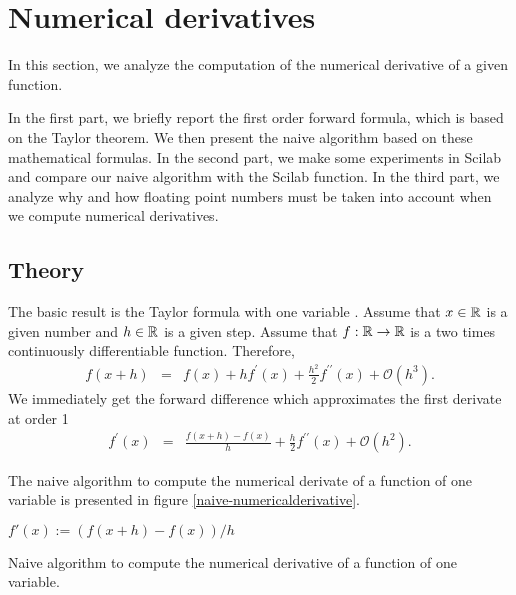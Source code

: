 %

\section{Numerical derivatives}

In this section, we analyze the computation of the numerical derivative of 
a given function.

In the first part, we briefly report the first order forward formula, which 
is based on the Taylor theorem.
We then present the naive algorithm based on these mathematical formulas. 
In the second part, we make some experiments in Scilab and compare our
naive algorithm with the  Scilab function.
In the third part, we analyze why and how floating point numbers must be taken 
into account when we compute numerical derivatives.

\subsection{Theory}

The basic result is the Taylor formula with one variable \cite{dixmier}.
Assume that $x\in\mathbb{R}$ is a given number  and $h\in\mathbb{R}$ is a given step. Assume 
that $f:\mathbb{R}\rightarrow\mathbb{R}$ is a two times continuously differentiable function. 
Therefore,
\begin{eqnarray}
f(x+h) &=& f(x) 
+ h f^\prime(x)
+\frac{h^2}{2} f^{\prime \prime}(x) + \mathcal{O}(h^3).
\end{eqnarray}
We immediately get the forward difference which approximates the first derivate at order 1 
\begin{eqnarray}
f^\prime(x) &=& \frac{f(x+h)  - f(x)}{h} + \frac{h}{2} f^{\prime \prime}(x) + \mathcal{O}(h^2).
\end{eqnarray}

The naive algorithm to compute the numerical derivate of 
a function of one variable is presented in figure \ref{naive-numericalderivative}.

\begin{algorithm}[htbp]
$f'(x) := (f(x+h)-f(x))/h$\;
\caption{Naive algorithm to compute the numerical derivative of a function of one variable.}
\label{naive-numericalderivative}
\end{algorithm}

